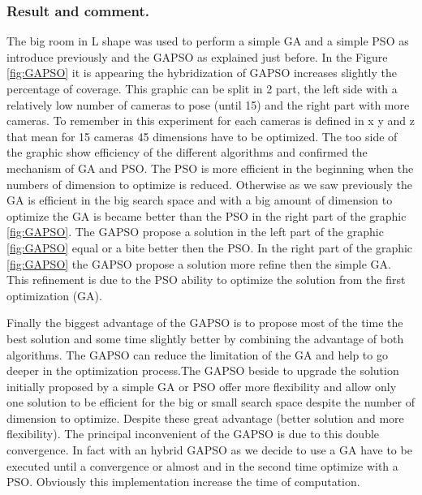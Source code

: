  \subsubsection{Result and comment.}
  

The big room in L shape was used to perform a simple GA and a simple PSO as introduce previously and the GAPSO as explained just before. In the Figure \ref{fig:GAPSO} it is appearing the hybridization of GAPSO increases slightly the percentage of coverage.%
This graphic can be split in 2 part, the left side with a relatively low number of cameras to pose (until 15) and the right part with more cameras. To remember in this experiment for each cameras is defined in x y and z that mean for 15 cameras 45 dimensions have to be optimized.
The too side of the graphic show efficiency  of the different algorithms and confirmed  the mechanism of GA and PSO.
The PSO is more efficient in the beginning when the numbers of dimension to optimize is reduced. Otherwise as we saw previously the GA is efficient in the big search space and with a big amount of dimension to optimize the GA is became better than the PSO in the right part of the graphic \ref{fig:GAPSO}. 
The GAPSO propose a solution in the left part of the graphic \ref{fig:GAPSO} equal or a bite better then the PSO. In the right part of the graphic \ref{fig:GAPSO} the GAPSO propose a solution more refine then the simple GA. This refinement is due to the PSO ability to optimize the solution from the first optimization (GA). 

Finally the biggest advantage of the GAPSO is to propose  most of the time the best solution and some time slightly better by combining the advantage of both algorithms. 
The GAPSO can reduce the limitation of the GA and help to go deeper in the optimization process.The GAPSO  beside to upgrade the solution initially proposed by a simple GA or PSO offer more flexibility and allow only one solution to be efficient for the big or small search space despite the number of dimension to optimize.
Despite these great advantage (better solution and more flexibility).
The principal inconvenient of the GAPSO is due to this double convergence. In fact with an hybrid GAPSO as we decide to use a GA have to be executed until a convergence or almost and in the second time optimize with a PSO.  Obviously this implementation increase the time of computation.
 
